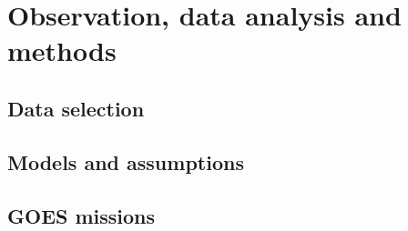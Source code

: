 \section{Observation, data analysis and methods}
    \subsection{Data selection}
    \subsection{Models and assumptions}
    \subsection{GOES missions}